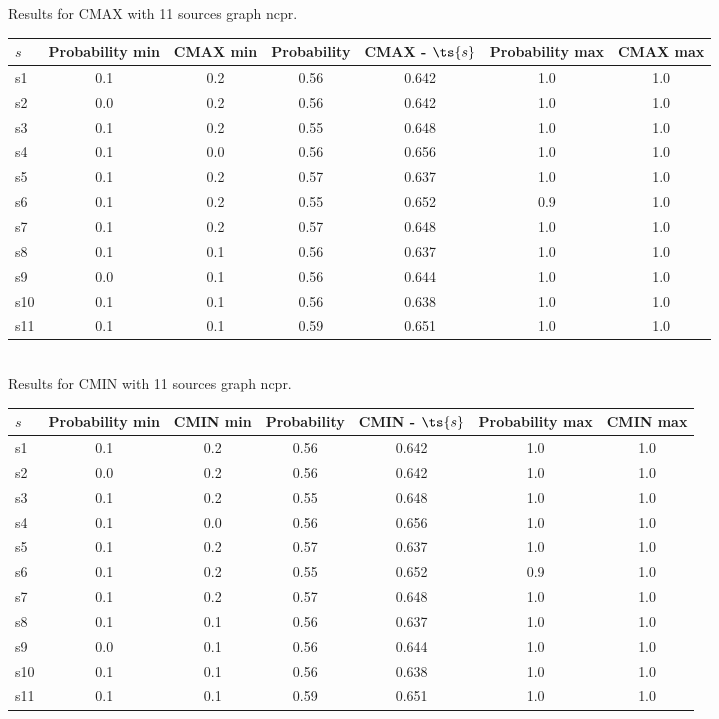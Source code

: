 \documentclass{article}
\begin{document}
\noindent Results for CMAX with 11 sources graph ncpr.

\noindent\begin{tabular}{|l|c|c|c|c|c|c|}
\hline
$s$& Probability min & CMAX min & Probability & CMAX - $\ts{s}$ & Probability max & CMAX max\\
\hline
s1 &0.1 & 0.2 & 0.56 & 0.642 & 1.0 & 1.0\\
\hline
s2 &0.0 & 0.2 & 0.56 & 0.642 & 1.0 & 1.0\\
\hline
s3 &0.1 & 0.2 & 0.55 & 0.648 & 1.0 & 1.0\\
\hline
s4 &0.1 & 0.0 & 0.56 & 0.656 & 1.0 & 1.0\\
\hline
s5 &0.1 & 0.2 & 0.57 & 0.637 & 1.0 & 1.0\\
\hline
s6 &0.1 & 0.2 & 0.55 & 0.652 & 0.9 & 1.0\\
\hline
s7 &0.1 & 0.2 & 0.57 & 0.648 & 1.0 & 1.0\\
\hline
s8 &0.1 & 0.1 & 0.56 & 0.637 & 1.0 & 1.0\\
\hline
s9 &0.0 & 0.1 & 0.56 & 0.644 & 1.0 & 1.0\\
\hline
s10 &0.1 & 0.1 & 0.56 & 0.638 & 1.0 & 1.0\\
\hline
s11 &0.1 & 0.1 & 0.59 & 0.651 & 1.0 & 1.0\\
\hline
\end{tabular}\\

\noindent Results for CMIN with 11 sources graph ncpr.

\noindent\begin{tabular}{|l|c|c|c|c|c|c|}
\hline
$s$& Probability min & CMIN min & Probability & CMIN - $\ts{s}$ & Probability max & CMIN max\\
\hline
s1 &0.1 & 0.2 & 0.56 & 0.642 & 1.0 & 1.0\\
\hline
s2 &0.0 & 0.2 & 0.56 & 0.642 & 1.0 & 1.0\\
\hline
s3 &0.1 & 0.2 & 0.55 & 0.648 & 1.0 & 1.0\\
\hline
s4 &0.1 & 0.0 & 0.56 & 0.656 & 1.0 & 1.0\\
\hline
s5 &0.1 & 0.2 & 0.57 & 0.637 & 1.0 & 1.0\\
\hline
s6 &0.1 & 0.2 & 0.55 & 0.652 & 0.9 & 1.0\\
\hline
s7 &0.1 & 0.2 & 0.57 & 0.648 & 1.0 & 1.0\\
\hline
s8 &0.1 & 0.1 & 0.56 & 0.637 & 1.0 & 1.0\\
\hline
s9 &0.0 & 0.1 & 0.56 & 0.644 & 1.0 & 1.0\\
\hline
s10 &0.1 & 0.1 & 0.56 & 0.638 & 1.0 & 1.0\\
\hline
s11 &0.1 & 0.1 & 0.59 & 0.651 & 1.0 & 1.0\\
\hline
\end{tabular}\\
\end{document}
